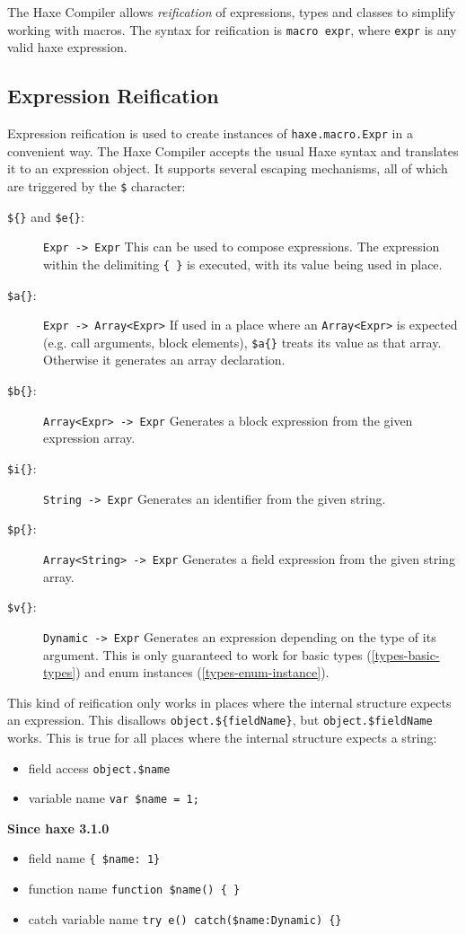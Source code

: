 \documentclass[a4paper,oneside]{book}
\newcommand{\type}[1]{\texttt{#1}}
\newcommand{\expr}[1]{\texttt{#1}}
\newcommand{\tref}[2]{#1 (\ref{#2})}
\newcommand{\since}[1]{\noindent\textbf{Since haxe #1}\\}
\begin{document}
The Haxe Compiler allows \emph{reification} of expressions, types and classes to simplify working with macros. The syntax for reification is \expr{macro expr}, where \expr{expr} is any valid haxe expression.

\subsection{Expression Reification}
\label{macro-reification-expression}

Expression reification is used to create instances of \type{haxe.macro.Expr} in a convenient way. The Haxe Compiler accepts the usual Haxe syntax and translates it to an expression object. It supports several escaping mechanisms, all of which are triggered by the \expr{\$} character:

\begin{description}
	\item[\expr{\$\{\}} and \expr{\$e\{\}}:] \type{Expr -> Expr} This can be used to compose expressions. The expression within the delimiting \expr{\{ \}} is executed, with its value being used in place.
	\item[\expr{\$a\{\}}:] \type{Expr -> Array<Expr>} If used in a place where an \type{Array<Expr>} is expected (e.g. call arguments, block elements), \expr{\$a\{\}} treats its value as that array. Otherwise it generates an array declaration.
	\item[\expr{\$b\{\}}:] \type{Array<Expr> -> Expr} Generates a block expression from the given expression array.
	\item[\expr{\$i\{\}}:] \type{String -> Expr} Generates an identifier from the given string.
	\item[\expr{\$p\{\}}:] \type{Array<String> -> Expr} Generates a field expression from the given string array.
	\item[\expr{\$v\{\}}:] \type{Dynamic -> Expr} Generates an expression depending on the type of its argument. This is only guaranteed to work for \tref{basic types}{types-basic-types} and \tref{enum instances}{types-enum-instance}.
\end{description}

This kind of reification only works in places where the internal structure expects an expression. This disallows \expr{object.\$\{fieldName\}}, but \expr{object.\$fieldName} works. This is true for all places where the internal structure expects a string:

\begin{itemize}
	\item field access \expr{object.\$name}
	\item variable name \expr{var \$name = 1;}
\end{itemize}
\since{3.1.0}
\begin{itemize}
	\item field name \expr{\{ \$name: 1\} }
	\item function name \expr{function \$name() \{ \}}
	\item catch variable name \expr{try e() catch(\$name:Dynamic) \{\}}
\end{itemize}
\end{document}
